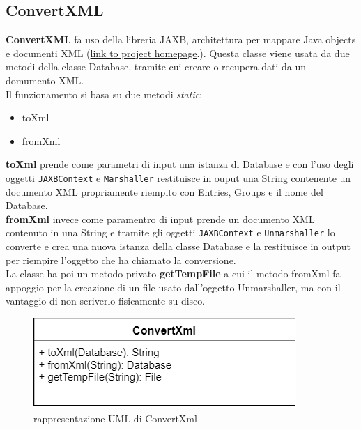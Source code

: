 \documentclass[a4paper,12pt]{report}
\begin{document}
\subsection*{ConvertXML}

\textbf{ConvertXML} fa uso della libreria JAXB, architettura per mappare Java objects e documenti XML (\href{https://javaee.github.io/jaxb-v2/}{link to project homepage}.). Questa classe viene usata da due metodi della classe Database, tramite cui creare o recupera dati da un domumento XML.\\

Il funzionamento si basa su due metodi \textit{static}:
\begin{itemize}
  \item toXml
  \item fromXml
\end{itemize}

\textbf{toXml} prende come parametri di input una istanza di Database e con l'uso degli oggetti \texttt{JAXBContext} e \texttt{Marshaller} restituisce in ouput una String contenente un documento XML propriamente riempito con Entries, Groups e il nome del Database.\\

\textbf{fromXml} invece come paramentro di input prende un documento XML contenuto in una String e tramite gli oggetti \texttt{JAXBContext} e \texttt{Unmarshaller} lo converte e crea una nuova istanza della classe Database e la restituisce in output per riempire l'oggetto che ha chiamato la conversione.\\

La classe ha poi un metodo privato \textbf{getTempFile} a cui il metodo fromXml fa appoggio per la creazione di un file usato dall'oggetto Unmarshaller, ma con il vantaggio di non scriverlo fisicamente su disco.\\

\begin{figure}[h]
\centering{}
\includegraphics[width=\textwidth]{ConvertXmlUml}
\caption{rappresentazione UML di ConvertXml}
\end{figure}
\end{document}
